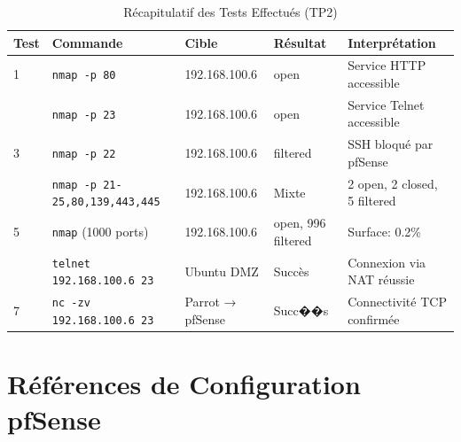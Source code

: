 \documentclass[12pt,a4paper,openany]{report}
\newcommand{\tableheadcolor}{\rowcolor{tableheadbg}}
\begin{document}
	\begin{table}[H]
		\centering
		\small
		\renewcommand{\arraystretch}{1.6}
		\setlength{\arrayrulewidth}{0.5pt}
		\begin{tabular}{>{\centering\arraybackslash}p{1cm} p{4cm} p{3.5cm} >{\centering\arraybackslash}p{2cm} p{3.5cm}}
			\arrayrulecolor{tableborder}
			\hline
			\tableheadcolor
			\textcolor{tableheadfg}{\textbf{Test}} &
			\textcolor{tableheadfg}{\textbf{Commande}} &
			\textcolor{tableheadfg}{\textbf{Cible}} &
			\textcolor{tableheadfg}{\textbf{Résultat}} &
			\textcolor{tableheadfg}{\textbf{Interprétation}} \\
			\hline
			\rowcolor{tablerowalt}
			1 & \texttt{nmap -p 80} & 192.168.100.6 & open & Service HTTP accessible \\
			
			2 & \texttt{nmap -p 23} & 192.168.100.6 & open & Service Telnet accessible \\
			
			\rowcolor{tablerowalt}
			3 & \texttt{nmap -p 22} & 192.168.100.6 & filtered & SSH bloqué par pfSense \\
			
			4 & \texttt{nmap -p 21-25,80,139,443,445} & 192.168.100.6 & Mixte & 2 open, 2 closed, 5 filtered \\
			
			\rowcolor{tablerowalt}
			5 & \texttt{nmap} (1000 ports) & 192.168.100.6 & 2 open, 996 filtered & Surface: 0.2\% \\
			
			6 & \texttt{telnet 192.168.100.6 23} & Ubuntu DMZ & Succès & Connexion via NAT réussie \\
			
			\rowcolor{tablerowalt}
			7 & \texttt{nc -zv 192.168.100.6 23} & Parrot → pfSense & Succ��s & Connectivité TCP confirmée \\
			\hline
		\end{tabular}
		\caption{Récapitulatif des Tests Effectués (TP2)}
	\end{table}
	
	\section{Références de Configuration pfSense}
	
\end{document}
